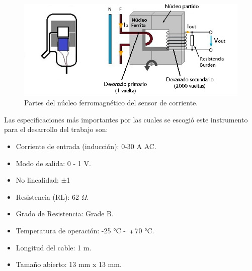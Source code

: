 \begin{figure}[htpb]
\centering 
\includegraphics[width=1.0\textwidth]{./Figures/espiras.jpg}
\caption{Partes del núcleo ferromagnético del sensor de corriente.}
\label{fig:espiras}
\end{figure}

Las especificaciones más importantes por las cuales se escogió este instrumento para el desarrollo del trabajo son:

\vspace{1.0cm}

\begin{itemize}
\item Corriente de entrada (inducción): 0-30 A AC.
\item Modo de salida: 0 - 1 V.
\item No linealidad: ±1%
\item Resistencia (RL): 62 $\Omega $.
\item Grado de Resistencia: Grade B.
\item Temperatura de operación: -25 °C - ﹢70 °C.
\item Longitud del cable: 1 m.
\item Tamaño abierto: 13 mm x 13 mm.
\end{itemize}





